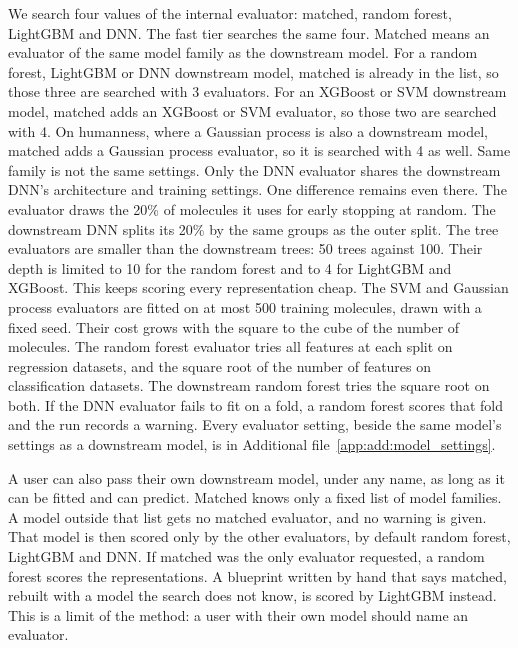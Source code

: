 We search four values of the internal evaluator: matched, random forest, LightGBM and DNN. The fast tier searches the same four. Matched means an evaluator of the same model family as the downstream model. For a random forest, LightGBM or DNN downstream model, matched is already in the list, so those three are searched with 3 evaluators. For an XGBoost or SVM downstream model, matched adds an XGBoost or SVM evaluator, so those two are searched with 4. On humanness, where a Gaussian process is also a downstream model, matched adds a Gaussian process evaluator, so it is searched with 4 as well. Same family is not the same settings. Only the DNN evaluator shares the downstream DNN's architecture and training settings. One difference remains even there. The evaluator draws the 20\% of molecules it uses for early stopping at random. The downstream DNN splits its 20\% by the same groups as the outer split. The tree evaluators are smaller than the downstream trees: 50 trees against 100. Their depth is limited to 10 for the random forest and to 4 for LightGBM and XGBoost. This keeps scoring every representation cheap. The SVM and Gaussian process evaluators are fitted on at most 500 training molecules, drawn with a fixed seed. Their cost grows with the square to the cube of the number of molecules. The random forest evaluator tries all features at each split on regression datasets, and the square root of the number of features on classification datasets. The downstream random forest tries the square root on both. If the DNN evaluator fails to fit on a fold, a random forest scores that fold and the run records a warning. Every evaluator setting, beside the same model's settings as a downstream model, is in Additional file~\ref{app:add:model_settings}.

A user can also pass their own downstream model, under any name, as long as it can be fitted and can predict. Matched knows only a fixed list of model families. A model outside that list gets no matched evaluator, and no warning is given. That model is then scored only by the other evaluators, by default random forest, LightGBM and DNN. If matched was the only evaluator requested, a random forest scores the representations. A blueprint written by hand that says matched, rebuilt with a model the search does not know, is scored by LightGBM instead. This is a limit of the method: a user with their own model should name an evaluator.

